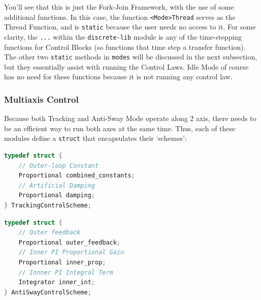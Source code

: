 \documentclass[letterpaper]{article}
\begin{document}
You'll see that this is just the Fork-Join Framework, with the use of some additional functions. In this case, the function \texttt{<Mode>Thread} serves as the Thread Function, and is \texttt{static} because the user needs no access to it. For some clarity, the \texttt{...} within the \texttt{discrete-lib} module is any of the time-stepping functions for Control Blocks (so functions that time step a transfer function). The other two \texttt{static} methods in \texttt{modes} will be discussed in the next subsection, but they essentially assist with running the Control Laws. Idle Mode of course has no need for these functions because it is not running any control law.

\subsubsection{Multiaxis Control}

Because both Tracking and Anti-Sway Mode operate along 2 axis, there needs to be an efficient way to run both axes at the same time. Thus, each of these modules define a \texttt{struct} that encapsulates their `schemes':
\begin{multicols}{2}
    \begin{center}
        \begin{lstlisting}[language=C]
typedef struct {
    // Outer-loop Constant
    Proportional combined_constants;
    // Artificial Damping
    Proportional damping;
} TrackingControlScheme;
        \end{lstlisting}   
    \end{center}
    \columnbreak
    \begin{center}
        \begin{lstlisting}[language=C]
typedef struct {
    // Outer feedback
    Proportional outer_feedback;
    // Inner PI Proportional Gain
    Proportional inner_prop;
    // Innner PI Integral Term
    Integrator inner_int;
} AntiSwayControlScheme;
        \end{lstlisting} 
    \end{center}
\end{multicols}
\end{document}
